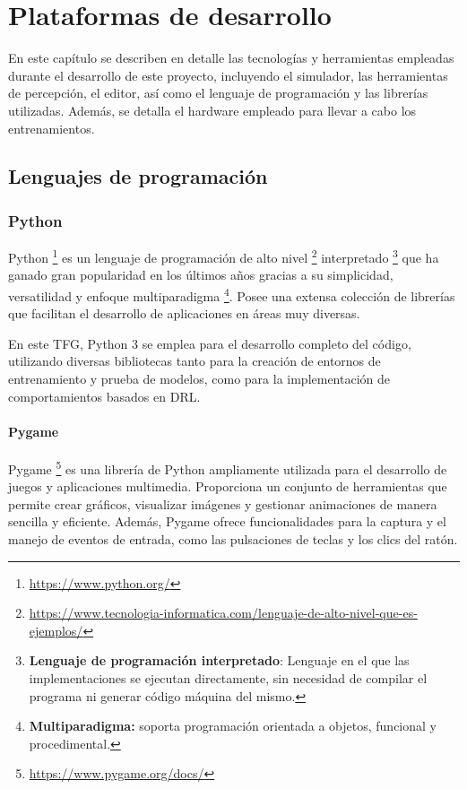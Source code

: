 \chapter{Plataformas de desarrollo}
\label{cap:capitulo3}

En este capítulo se describen en detalle las tecnologías y herramientas empleadas durante el desarrollo de este proyecto, incluyendo el simulador, las herramientas de percepción, el editor, así como el lenguaje de programación y las librerías utilizadas. Además, se detalla el hardware empleado para llevar a cabo los entrenamientos.

\section{Lenguajes de programación}
\label{sec:programación}
\subsection{Python}
\label{sec:python}

Python \footnote{\url{https://www.python.org/}} es un lenguaje de programación de alto nivel \footnote{\url{https://www.tecnologia-informatica.com/lenguaje-de-alto-nivel-que-es-ejemplos/}} interpretado \footnote{\textbf{Lenguaje de programación interpretado}: Lenguaje en el que las implementaciones se ejecutan directamente, sin necesidad de compilar el programa ni generar código máquina del mismo.} que ha ganado gran popularidad en los últimos años gracias a su simplicidad, versatilidad y enfoque multiparadigma \footnote{\textbf{Multiparadigma:} soporta programación orientada a objetos, funcional y procedimental.}. Posee una extensa colección de librerías que facilitan el desarrollo de aplicaciones en áreas muy diversas.

En este \ac{TFG}, Python 3 se emplea para el desarrollo completo del código, utilizando diversas bibliotecas tanto para la creación de entornos de entrenamiento y prueba de modelos, como para la implementación de comportamientos basados en \ac{DRL}.

\subsubsection{Pygame}
\label{sec:pygame}

Pygame \footnote{\url{https://www.pygame.org/docs/}} es una librería de Python ampliamente utilizada para el desarrollo de juegos y aplicaciones multimedia. Proporciona un conjunto de herramientas que permite crear gráficos, visualizar imágenes y gestionar animaciones de manera sencilla y eficiente. Además, Pygame ofrece funcionalidades para la captura y el manejo de eventos de entrada, como las pulsaciones de teclas y los clics del ratón.

